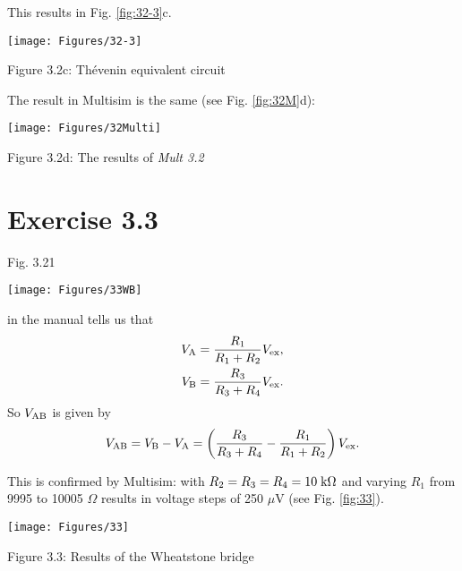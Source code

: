 This results in Fig. \ref{fig:32-3}c.
\begin{center}
    \texttt{[image: Figures/32-3]}
 
    Figure 3.2c: Th\'{e}venin equivalent circuit
    \label{fig:32-3} 
\end{center}

\newpage
\noindent The result in Multisim is the same (see Fig. \ref{fig:32M}d):
\begin{center}
    \texttt{[image: Figures/32Multi]}	
 
    Figure 3.2d: The results of \textit{Mult 3.2}	  
    \label{fig:32M} 
\end{center}

\newpage
\section{\textbf{Exercise 3.3}}
Fig. 3.21 
\begin{center}
    \texttt{[image: Figures/33WB]}	
\end{center}

\noindent in the manual tells us that
\begin{equation}
\begin{split}
V_{\rm A} & = \frac{R_1}{R_1 + R_2}V_{\rm ex}, \\
V_{\rm B} & = \frac{R_3}{R_3 + R_4}V_{\rm ex}. 
\end{split}
\end{equation}
So $V_{\rm AB}$ is given by
\begin{equation}
V_{\rm AB} = V_{\rm B} - V_{\rm A} = \left( \frac{R_3}{R_3 + R_4} - \frac{R_1}{R_1 + R_2} \right) V_{\rm ex}.
\end{equation}

This is confirmed by Multisim: with $R_2 = R_3 = R_4 = 10 \; {\rm k} \Omega$ and varying $R_1$ from 9995 to 10005 $\Omega$ results in voltage steps of 250 $\mu$V (see Fig. \ref{fig:33}). 
\begin{center}
    \texttt{[image: Figures/33]}	
 
    Figure 3.3: Results of the Wheatstone bridge  
    \label{fig:33} 
\end{center}
